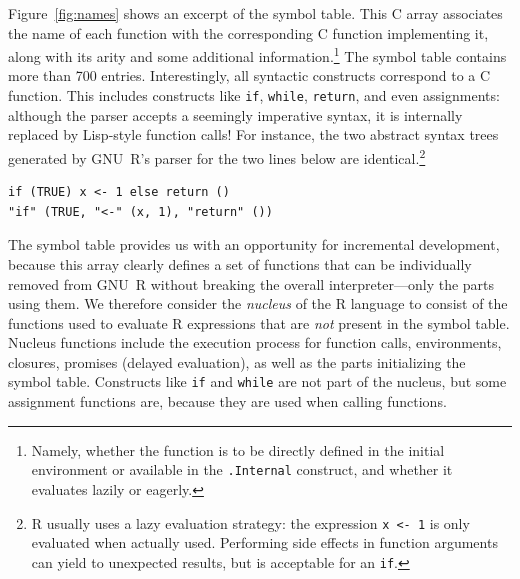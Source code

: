 \documentclass[
    sigplan,
    10pt,
    review, %
    natbib=false %
 ]{acmart}
\newcommand\mb[1]{\todo[color=purple!20,size=\scriptsize]{#1}}
\newcommand\et[1]{\todo[color=blue!20,size=\scriptsize]{#1}}
\begin{document}
Figure~\ref{fig:names} shows an excerpt of the symbol table.
This C array associates the name of each function with the corresponding C function implementing it, along with its arity and some additional information.\footnote{Namely, whether the function is to be directly defined in the initial environment or available in the \texttt{.Internal} construct, and whether it evaluates lazily or eagerly.}
The symbol table contains more than 700 entries.
Interestingly, all syntactic constructs correspond to a C function. This includes constructs like \texttt{if}, \texttt{while}, \texttt{return}, and even assignments: although the parser accepts a seemingly imperative syntax, it is internally replaced by Lisp-style function calls!
For instance, the two abstract syntax trees generated
by GNU~R's parser for the two lines below are identical.\footnote{
    R usually uses a lazy evaluation strategy:
    the expression \texttt{x <- 1} is only evaluated
    when actually used.
    Performing side effects in function arguments can yield to unexpected results,
    but is acceptable for an \texttt{if}.
}
\begin{verbatim}
if (TRUE) x <- 1 else return ()
"if" (TRUE, "<-" (x, 1), "return" ())
\end{verbatim}

The symbol table provides us with an opportunity for incremental development, because this array clearly defines a set of functions that can be individually removed from GNU~R without breaking the overall interpreter---only the parts using them.
We therefore consider the {\em nucleus} of the R language to consist of the functions used to evaluate R expressions that are \emph{not} present in the symbol table.
Nucleus functions include the execution process for function calls, environments, closures, promises (delayed evaluation),
as well as the parts initializing the symbol table. Constructs like \texttt{if} and \texttt{while} are not part of the nucleus,
but some assignment functions are, because they are used when calling functions.
\end{document}
